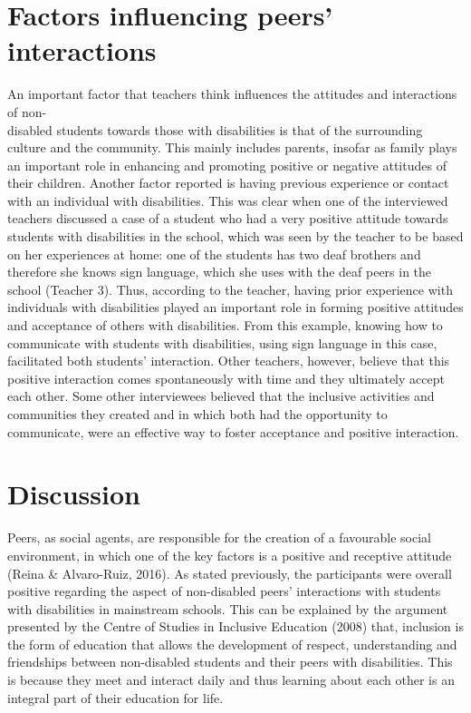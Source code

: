\documentclass[11pt]{sig-alternate}
\begin{document}
\begin{large}
{\section*{Factors influencing peers’ interactions}
An important factor that teachers think influences the attitudes and interactions of non-\\disabled students towards those with disabilities is that of the surrounding culture and the community. This mainly includes parents, insofar as family plays an important role in enhancing and promoting positive or negative attitudes of their children.  Another factor reported is having previous experience or contact with an individual with disabilities. This was clear when one of the interviewed teachers discussed a case of a student who had a very positive attitude towards students with disabilities in the school, which was seen by the teacher to be based on her experiences at home: one of the students has two deaf brothers and therefore she knows sign language, which she uses with the deaf peers in the school (Teacher 3). Thus, according to the teacher, having prior experience with individuals with disabilities played an important role in forming positive attitudes and acceptance of others with disabilities. From this example, knowing how to communicate with students with disabilities, using sign language in this case, facilitated both students’ interaction. Other teachers, however, believe that this positive interaction comes spontaneously with time and they ultimately accept each other. Some other interviewees believed that the inclusive activities and communities they created and in which both had the opportunity to communicate, were an effective way to foster acceptance and positive interaction.

\section*{Discussion} 
Peers, as social agents, are responsible for the creation of a favourable social environment, in which one of the key factors is a positive and receptive attitude (Reina \& Alvaro-Ruiz, 2016). As stated previously, the participants were overall positive regarding the aspect of non-disabled peers’ interactions with students with disabilities in mainstream schools. This can be explained by the argument presented by the Centre of Studies in Inclusive Education (2008) that, inclusion is the form of education that allows the development of respect, understanding and friendships between non-disabled students and their peers with disabilities. This is because they meet and interact daily and thus learning about each other is an integral part of their education for life. 

}
\end{large}
\end{document}
